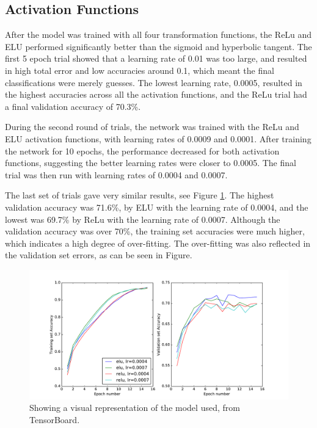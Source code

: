 \documentclass[]{article}
\begin{document}
\subsection{Activation Functions}

After the model was trained with all four transformation functions, the ReLu and ELU performed significantly better than the sigmoid and hyperbolic tangent. The first 5 epoch trial showed that a learning rate of 0.01 was too large, and resulted in high total error and low accuracies around 0.1, which meant the final classifications were merely guesses. The lowest learning rate, 0.0005, resulted in the highest accuracies across all the activation functions, and the ReLu trial had a final validation accuracy of 70.3\%. 

During the second round of trials, the network was trained with the ReLu and ELU activation functions, with learning rates of 0.0009 and 0.0001. After training the network for 10 epochs, the performance decreased for both activation functions, suggesting the better learning rates were closer to 0.0005. The final trial was then run with learning rates of 0.0004 and 0.0007. 

The last set of trials gave very similar results, see Figure \ref{ac_res}. The highest validation accuracy was 71.6\%, by ELU with the learning rate of 0.0004, and the lowest was 69.7\% by ReLu with the learning rate of 0.0007. Although the validation accuracy was over 70\%, the training set accuracies were much higher, which indicates a high degree of over-fitting. The over-fitting was also reflected in the validation set errors, as can be seen in Figure. 

\begin{figure}[h]
	\includegraphics[width=\textwidth]{ac_res}
	\caption{Showing a visual representation of the model used, from TensorBoard.}
	\label{ac_res}
	\centering
\end{figure}
\end{document}
